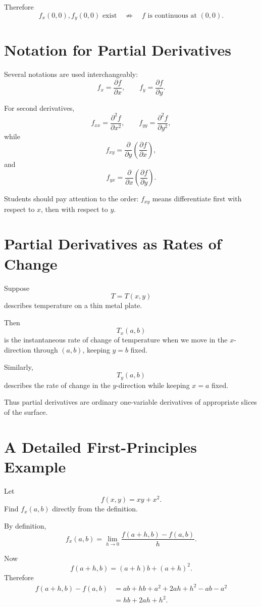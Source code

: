 \documentclass[11pt,oneside]{book}
\theoremstyle{studentthm}
\theoremstyle{definition}
\newcommand{\pd}[2]{\frac{\partial #1}{\partial #2}}
\begin{document}
Therefore
\[
f_x(0,0),f_y(0,0)\text{ exist}
\quad\not\Rightarrow\quad
f\text{ is continuous at }(0,0).
\]


\section{Notation for Partial Derivatives}

Several notations are used interchangeably:
\[
f_x
=
\pd{f}{x},
\qquad
f_y
=
\pd{f}{y}.
\]

For second derivatives,
\[
f_{xx}
=
\frac{\partial^2f}{\partial x^2},
\qquad
f_{yy}
=
\frac{\partial^2f}{\partial y^2},
\]
while
\[
f_{xy}
=
\frac{\partial}{\partial y}
\left(
\pd{f}{x}
\right),
\]
and
\[
f_{yx}
=
\frac{\partial}{\partial x}
\left(
\pd{f}{y}
\right).
\]

Students should pay attention to the order: \(f_{xy}\) means
differentiate first with respect to \(x\), then with respect to \(y\).

\section{Partial Derivatives as Rates of Change}

Suppose
\[
T=T(x,y)
\]
describes temperature on a thin metal plate.

Then
\[
T_x(a,b)
\]
is the instantaneous rate of change of temperature when we move in the
\(x\)-direction through \((a,b)\), keeping \(y=b\) fixed.

Similarly,
\[
T_y(a,b)
\]
describes the rate of change in the \(y\)-direction while keeping
\(x=a\) fixed.

Thus partial derivatives are ordinary one-variable derivatives of
appropriate slices of the surface.

\section{A Detailed First-Principles Example}

Let
\[
f(x,y)=xy+x^2.
\]
Find \(f_x(a,b)\) directly from the definition.

By definition,
\[
f_x(a,b)
=
\lim_{h\to0}
\frac{
f(a+h,b)-f(a,b)
}{h}.
\]

Now
\[
f(a+h,b)
=
(a+h)b+(a+h)^2.
\]
Therefore
\[
\begin{aligned}
f(a+h,b)-f(a,b)
&=
ab+hb+a^2+2ah+h^2-ab-a^2\\
&=
hb+2ah+h^2.
\end{aligned}
\]
\end{document}

